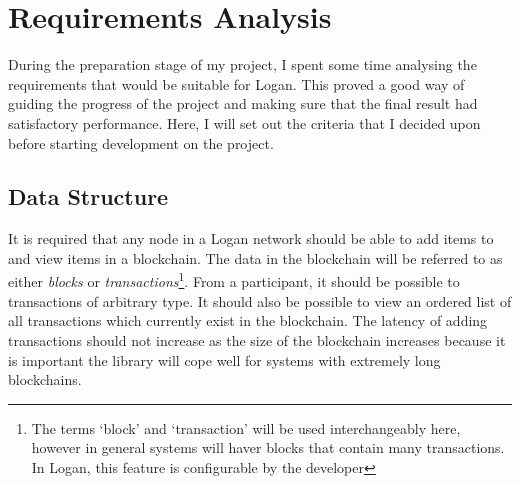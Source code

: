 \documentclass[12pt,a4paper,twoside,openright]{report}
\begin{document}
	\section{Requirements Analysis} \label{Requirements Analysis}
	During the preparation stage of my project, I spent some time analysing the requirements that would be suitable for Logan. 
	This proved a good way of guiding the progress of the project and making sure that the final result had satisfactory performance. 
	Here, I will set out the criteria that I decided upon before starting development on the project.

	\subsection{Data Structure}
	It is required that any node in a Logan network should be able to add items to and view items in a blockchain. 
	The data in the blockchain will be referred to as either \textit{blocks} or \textit{transactions}\footnote{The terms `block' and `transaction' will be used interchangeably here, however in general systems will haver blocks that contain many transactions. In Logan, this feature is configurable by the developer}. 
	From a participant, it should be possible to transactions of arbitrary type. 
	It should also be possible to view an ordered list of all transactions which currently exist in the blockchain.
	The latency of adding transactions should not increase as the size of the blockchain increases because it is important the library will cope well for systems with extremely long blockchains.\\
\end{document}
